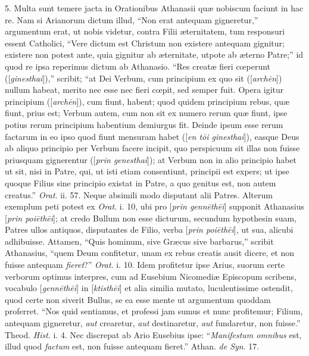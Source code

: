 5. Multa
sunt temere jacta in Orationibus Athanasii quæ nobiscum faciunt in
hac re. Nam si Arianorum dictum illud, ``Non erat antequam gigneretur,''
argumentum erat, ut nobis videtur, contra Filii æternitatem, tum
responsuri essent Catholici, ``Vere dictum est Christum non existere
antequam gignitur; existere non potest ante, quia gignitur ab æternitate,
utpote ab æterno Patre;'' id quod re ipsa reperimus dictum ab
Athanasio. ``Res creatæ fieri cœperunt ([\emph{ginesthai}]),'' scribit;
``at Dei Verbum, cum principium ex quo sit ([\emph{arch\={e}n}])
nullum habeat, merito nec esse nec fieri cœpit, sed semper fuit.
Opera igitur principium ([\emph{arch\={e}n}]), cum fiunt, habent;
quod quidem principium rebus, quæ fiunt, prius est; Verbum autem, cum
non sit ex numero rerum quæ fiunt, ipse potius rerum principium
habentium demiurgus fit. Deinde ipsum esse rerum factarum in eo ipso
quod fiunt mensuram habet ([\emph{en t\={o}i ginesthai}]), easque
Deus ab aliquo principio per Verbum facere incipit, quo perspicuum sit
illas non fuisse priusquam gignerentur ([\emph{prin genesthai}]); at
Verbum non in alio principio habet ut sit, nisi in Patre, qui, ut isti
etiam consentiunt, principii est expers; ut ipse quoque Filius sine
principio existat in Patre, a quo genitus est, non autem creatus.'' \emph{Orat}.
ii. 57. Neque absimili modo disputant alii Patres. Alterum exemplum
peti potest ex \emph{Orat}. i. 10, ubi pro [\emph{prin genn\={e}th\={e}i}]
supponit Athanasius [\emph{prin poi\={e}th\={e}i}]; at credo
Bullum non esse dicturum, secundum hypothesin suam, Patres ullos
antiquos, disputantes de Filio, verba [\emph{prin poi\={e}th\={e}i}],
ut sua, alicubi adhibuisse. Attamen, ``Quis hominum, sive Græcus
sive barbarus,'' scribit Athanasius, ``quem Deum confitetur, unam ex
rebus creatis ausit dicere, et non fuisse antequam \emph{fieret}?'' \emph{Orat}.
i. 10. Idem profitetur ipse Arius, suorum certe verborum optimus
interpres, cum ad Eusebium Nicomediæ Episcopum scribens, vocabulo [\emph{genn\={e}th\={e}i}]
in [\emph{ktisth\={e}i}] et alia similia mutato, luculentissime
ostendit, quod certe non siverit Bullus, se ea esse mente ut
argumentum quoddam proferret. ``Nos quid sentiamus, et professi jam
sumus et nunc profitemur; Filium, antequam gigneretur, \emph{aut}
crearetur, \emph{aut} destinaretur, \emph{aut} fundaretur, non fuisse.''
Theod. \emph{Hist}. i. 4. Nec discrepat ab Ario Eusebius ipse: ``\emph{Manifestum
omnibus} est, illud quod \emph{factum} est, non fuisse antequam
fieret.'' Athan. \emph{de Syn}. 17.

